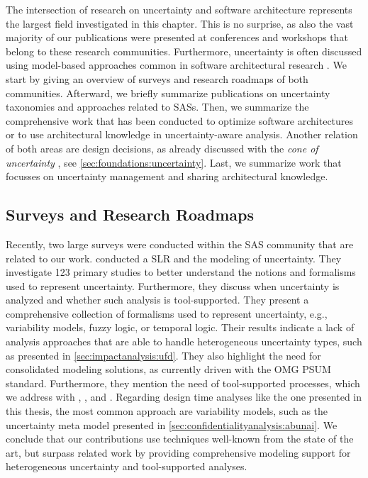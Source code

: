 The intersection of research on uncertainty and software architecture represents the largest field investigated in this chapter.
This is no surprise, as also the vast majority of our publications were presented at conferences and workshops that belong to these research communities.
Furthermore, uncertainty is often discussed using model-based approaches common in software architectural research \cite{troya_uncertainty_2021,sobhy_evaluation_2021}.
We start by giving an overview of surveys and research roadmaps of both communities.
Afterward, we briefly summarize publications on uncertainty taxonomies and approaches related to \acfp{SAS}.
Then, we summarize the comprehensive work that has been conducted to optimize software architectures or to use architectural knowledge in uncertainty-aware analysis.
Another relation of both areas are design decisions, as already discussed with the \emph{cone of uncertainty} \cite{mcconnell_software_1998}, see \autoref{sec:foundations:uncertainty}.
Last, we summarize work that focusses on uncertainty management and sharing architectural knowledge.


\subsection{Surveys and Research Roadmaps}

Recently, two large surveys were conducted within the \acf{SAS} community that are related to our work.
\textcite{troya_uncertainty_2021} conducted a \acf{SLR} and the modeling of uncertainty.
They investigate 123 primary studies to better understand the notions and formalisms used to represent uncertainty.
Furthermore, they discuss when uncertainty is analyzed and whether such analysis is tool-supported.
They present a comprehensive collection of formalisms used to represent uncertainty, e.g., variability models, fuzzy logic, or temporal logic.
Their results indicate a lack of analysis approaches that are able to handle heterogeneous uncertainty types, such as presented in \autoref{sec:impactanalysis:ufd}.
They also highlight the need for consolidated modeling solutions, as currently driven with the \acf{OMG} \acf{PSUM} \cite{PSUM} standard.
Furthermore, they mention the need of tool-supported processes, which we address with \abunai, \uia, and \arcen.
Regarding design time analyses like the one presented in this thesis, the most common approach are variability models, such as the uncertainty meta model presented in \autoref{sec:confidentialityanalysis:abunai}.
We conclude that our contributions use  techniques well-known from the state of the art, but surpass related work by providing comprehensive modeling support for heterogeneous uncertainty and tool-supported analyses.

